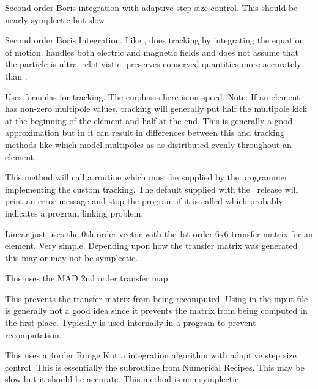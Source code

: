 \begin{description}
\item[\vn{adaptive_boris}]
Second order Boris integration\cite{b:boris} with adaptive step size control.
This should be nearly symplectic but slow.

\item[\vn{Boris}]
Second order Boris Integration\cite{b:boris}. Like ,
 does tracking by integrating the equation of
motion.  handles both electric and magnetic fields and does
not assume that the particle is ultra--relativistic.  preserves
conserved quantities more accurately than .

\item[\vn{Bmad_Standard}]
Uses formulas for tracking. The emphasis here is on speed. Note: If an
element has non-zero multipole values,  tracking
will generally put half the multipole kick at the beginning of the
element and half at the end. This is generally a good approximation
but in it can result in differences between this and tracking methods
like  which model multipoles as as distributed evenly
throughout an element.

\item[\vn{Custom}]
This method will call a routine  which must be
supplied by the programmer implementing the custom tracking. The
default  supplied with the \bmad\ release will print
an error message and stop the program if it is called which probably
indicates a program linking problem.

\item[\vn{Linear}]
Linear just uses the 0th order vector with the 1st order 6x6 transfer
matrix for an element. Very simple.  Depending upon how the transfer
matrix was generated this may or may not be symplectic.

\item[\vn{MAD}]
This uses the MAD 2nd order transfer map.

\item[\vn{None}]
This prevents the transfer matrix from being recomputed.
Using  in the input file is generally not a good idea since
it prevents the matrix from being computed in the first place.
Typically  is used internally in a program to prevent recomputation.

\item[\vn{Runge_Kutta}]
This uses a 4\Th order Runge Kutta integration algorithm with adaptive
step size control.  This is essentially the  subroutine
from Numerical Recipes\cite{b:nr}. This may be slow but it should be
accurate. This method is non-symplectic.


\end{description}
